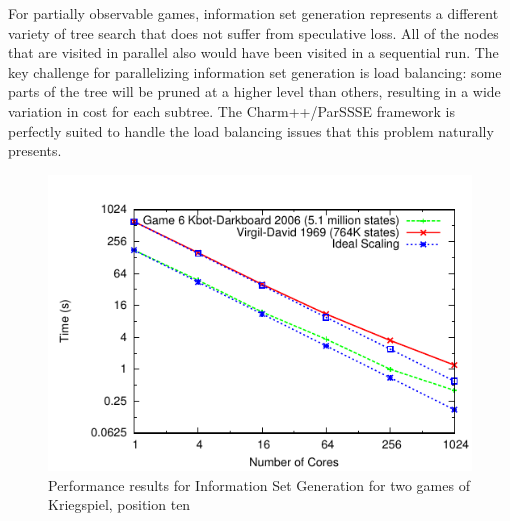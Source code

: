 \documentclass[10pt, conference, compsocconf]{IEEEtran}
\begin{document}
For partially observable games, information set generation represents a
different variety of tree search that does not suffer from speculative loss.
All of the nodes that are visited in parallel also would have been visited in a
sequential run.  The key challenge for parallelizing information set generation
is load balancing: some parts of the tree will be pruned at a higher level than
others, resulting in a wide variation in cost for each subtree.  The {\sc
Charm++/ParSSSE} framework is perfectly suited to handle the load balancing
issues that this problem naturally presents.

\begin{figure}[t]
 \centering \includegraphics[scale=1]{plots/new.pdf} %
\caption{Performance results for Information Set Generation for two games of Kriegspiel, position ten}
\label{prob4} 
\end{figure}
\end{document}
